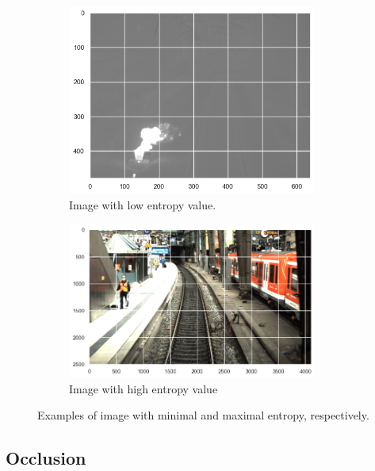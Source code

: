 \documentclass[Master,MDS,english]{BASE/twbook} %
\begin{document}
\begin{figure}
\centering
\begin{subfigure}{.5\textwidth}
  \centering
  \includegraphics[width=0.9\textwidth]{images/datasets/db/low_entropy}
  \caption{Image with low entropy value.}
  \label{fig:entropy_sub1}
\end{subfigure}%
\begin{subfigure}{.5\textwidth}
  \centering
  \includegraphics[width=0.9\textwidth]{images/datasets/db/high_entropy}
  \caption{Image with high entropy value}
 \label{fig:entropy_sub2}
\end{subfigure}
\caption{Examples of image with minimal and maximal entropy, respectively.}
\label{fig:entropy_examples}
\end{figure}


\subsection{Occlusion}
\end{document}

